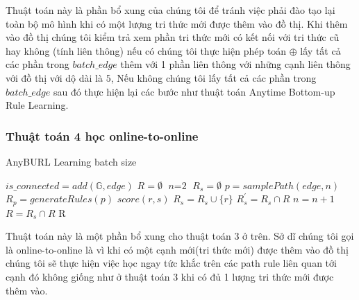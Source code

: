 Thuật toán này là phần bổ xung của chúng tôi để tránh việc phải đào tạo lại toàn bộ mô hình khi có một lượng tri thức mới được thêm vào đồ thị. Khi thêm vào đồ thị chúng tôi kiểm trả xem phần tri thức mới có kết nối với tri thức cũ hay không (tính liên thông) nếu có chúng tôi thực hiện phép toán \(\oplus\) lấy  tất cả các phần trong \(batch\_edge\) thêm với 1 phần liên thông với những cạnh liên thông với đồ thị với dộ dài là \(5\), Nếu không chúng tôi lấy tất cả các phần trong \(batch\_edge\) sau đó thực hiện lại các bước như thuật toán Anytime Bottom-up Rule Learning.

\subsubsection{Thuật toán 4 học online-to-online}
\begin{algorithm}
\caption{AnyBURL Learning batch size}\label{euclid}
\begin{algorithmic}[1]
\State $is\_connected = add(\mathbb{G}, edge)$
\State $R = \emptyset$
    \State $\textit{n} = \text{2}$
    \State $R_s = \emptyset$
    \Repeat
        \State $p = samplePath(edge, n)$
        \State $R_p = generateRules(p)$
            \State $score(r, s)$
        	    \State $R_s = R_s \cup \{r\}$
            \EndIf
        \EndFor
    \State $R^{\prime}_s = R_s \cap R$
    	\State $n = n + 1$
    \EndIf
    \State $R = R_s \cap R$
\State \Return R
\EndIf
\EndProcedure
\end{algorithmic}
\end{algorithm}

Thuật toán này là một phần bổ xung cho thuật toán 3 ở trên. Sở dĩ chúng tôi gọi là online-to-online là vì khi có một cạnh mới(tri thức mới) được thêm vào đồ thị chúng tôi sẽ thực hiện việc học ngay tức khắc trên các path rule liên quan tới cạnh đó không giống như ở thuật toán 3 khi có đủ 1 lượng tri thức mới được thêm vào.



